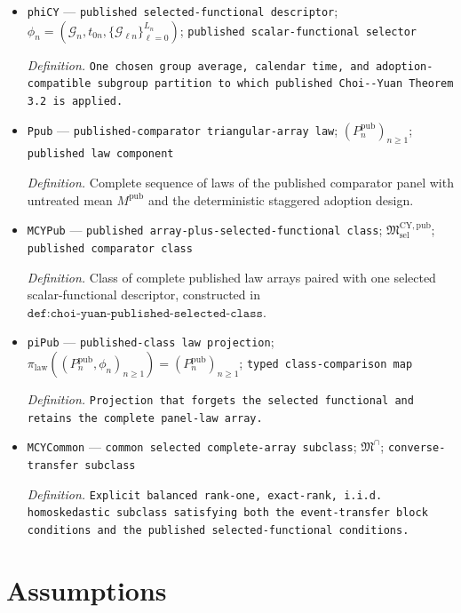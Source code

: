 \documentclass{article}
\begin{document}
\begin{itemize}
  \item \texttt{phiCY} --- \texttt{published selected-\allowbreak{}functional descriptor}; \(\phi_n=(\mathcal G_n,t_{0n},\{\mathcal G_{\ell n}\}_{\ell=0}^{L_n})\); \texttt{published scalar-\allowbreak{}functional selector}
  \par\smallskip\noindent\emph{Definition.} \texttt{One chosen group average,\allowbreak{} calendar time,\allowbreak{} and adoption-\allowbreak{}compatible subgroup partition to which published Choi-\allowbreak{}-\allowbreak{}Yuan Theorem 3.2 is applied.}
  \item \texttt{Ppub} --- \texttt{published-\allowbreak{}comparator triangular-\allowbreak{}array law}; \((P_n^{\mathrm{pub}})_{n\ge1}\); \texttt{published law component}
  \par\smallskip\noindent\emph{Definition.} Complete sequence of laws of the published comparator panel with untreated mean \(M^{\mathrm{pub}}\) and the deterministic staggered adoption design.
  \item \texttt{MCYPub} --- \texttt{published array-\allowbreak{}plus-\allowbreak{}selected-\allowbreak{}functional class}; \(\mathfrak M^{\mathrm{CY,pub}}_{\mathrm{sel}}\); \texttt{published comparator class}
  \par\smallskip\noindent\emph{Definition.} Class of complete published law arrays paired with one selected scalar-functional descriptor, constructed in \(\texttt{def:choi-yuan-published-selected-class}\).
  \item \texttt{piPub} --- \texttt{published-\allowbreak{}class law projection}; \(\pi_{\mathrm{law}}((P_n^{\mathrm{pub}},\phi_n)_{n\ge1})=(P_n^{\mathrm{pub}})_{n\ge1}\); \texttt{typed class-\allowbreak{}comparison map}
  \par\smallskip\noindent\emph{Definition.} \texttt{Projection that forgets the selected functional and retains the complete panel-\allowbreak{}law array.}
  \item \texttt{MCYCommon} --- \texttt{common selected complete-\allowbreak{}array subclass}; \(\mathfrak M^\cap\); \texttt{converse-\allowbreak{}transfer subclass}
  \par\smallskip\noindent\emph{Definition.} \texttt{Explicit balanced rank-\allowbreak{}one,\allowbreak{} exact-\allowbreak{}rank,\allowbreak{} i.i.d. homoskedastic subclass satisfying both the event-\allowbreak{}transfer block conditions and the published selected-\allowbreak{}functional conditions.}
\end{itemize}

\section{Assumptions}
\end{document}
